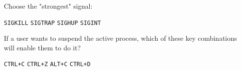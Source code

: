 \documentclass[a4paper,11pt]{exam}
\newcommand{\shell}[1]{\texttt{#1}}
\begin{document}
\begin{questions}
	\question
  Choose the "strongest" signal:

  \begin{oneparchoices}
		\CorrectChoice \shell{SIGKILL}
		\choice \shell{SIGTRAP}
    \choice \shell{SIGHUP}
    \choice \shell{SIGINT}  
  \end{oneparchoices}


	\question
  If a user wants to suspend the active process, which of these key combinations will enable them to do it?

  \begin{oneparchoices}
		\choice \shell{CTRL+C}
		\CorrectChoice \shell{CTRL+Z}
    \choice \shell{ALT+C}
    \choice \shell{CTRL+D}  
  \end{oneparchoices}
	
\vspace{1em}

\end{questions}
\end{document}
